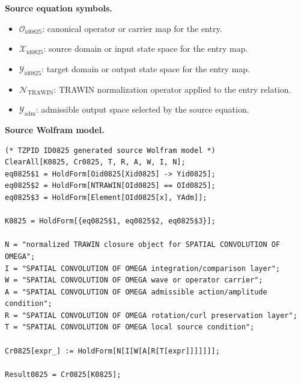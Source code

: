 \begin{minipage}[t]{0.49\linewidth}
\begingroup
\small
\raggedright
\textbf{Source equation symbols.}\par
\begin{itemize}[leftmargin=1.35em,itemsep=1pt,topsep=1pt,parsep=0pt]
    \item $\mathcal{O}_{\mathrm{id0825}}$: canonical operator or carrier map for the entry.
    \item $\mathcal{X}_{\mathrm{id0825}}$: source domain or input state space for the entry map.
    \item $\mathcal{Y}_{\mathrm{id0825}}$: target domain or output state space for the entry map.
    \item $\mathcal{N}_{\mathrm{TRAWIN}}$: TRAWIN normalization operator applied to the entry relation.
    \item $\mathcal{Y}_{\mathrm{adm}}$: admissible output space selected by the source equation.
\end{itemize}
\endgroup
\end{minipage}\hfill
\begin{minipage}[t]{0.47\linewidth}
\begingroup
\scriptsize
\raggedright
\textbf{Source Wolfram model.}\par
\begin{Verbatim}[fontsize=\tiny,breaklines=true,breakanywhere=true]
(* TZPID ID0825 generated source Wolfram model *)
ClearAll[K0825, Cr0825, T, R, A, W, I, N];
eq0825$1 = HoldForm[Oid0825[Xid0825] -> Yid0825];
eq0825$2 = HoldForm[NTRAWIN[OId0825] == OId0825];
eq0825$3 = HoldForm[Element[OId0825[x], YAdm]];

K0825 = HoldForm[{eq0825$1, eq0825$2, eq0825$3}];

N = "normalized TRAWIN closure object for SPATIAL CONVOLUTION OF OMEGA";
I = "SPATIAL CONVOLUTION OF OMEGA integration/comparison layer";
W = "SPATIAL CONVOLUTION OF OMEGA wave or operator carrier";
A = "SPATIAL CONVOLUTION OF OMEGA admissible action/amplitude condition";
R = "SPATIAL CONVOLUTION OF OMEGA rotation/curl preservation layer";
T = "SPATIAL CONVOLUTION OF OMEGA local source condition";

Cr0825[expr_] := HoldForm[N[I[W[A[R[T[expr]]]]]]];

Result0825 = Cr0825[K0825];
\end{Verbatim}
\endgroup
\end{minipage}

